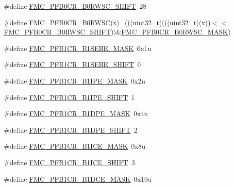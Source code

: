 \begin{DoxyCompactItemize}
\#define \hyperlink{group___f_m_c___register___masks_gafc34ff86025a1657d05d3f6a2de1ec7f}{F\+M\+C\+\_\+\+P\+F\+B0\+C\+R\+\_\+\+B0\+R\+W\+S\+C\+\_\+\+S\+H\+I\+FT}~28
\item 
\#define \hyperlink{group___f_m_c___register___masks_ga4ddd6d13f0feab2f52a6ab8e3417d738}{F\+M\+C\+\_\+\+P\+F\+B0\+C\+R\+\_\+\+B0\+R\+W\+SC}(x)                                      ~(((\hyperlink{_p_e___types_8h_a33594304e786b158f3fb30289278f5af}{uint32\+\_\+t})(((\hyperlink{_p_e___types_8h_a33594304e786b158f3fb30289278f5af}{uint32\+\_\+t})(x))$<$$<$\hyperlink{group___f_m_c___register___masks_gafc34ff86025a1657d05d3f6a2de1ec7f}{F\+M\+C\+\_\+\+P\+F\+B0\+C\+R\+\_\+\+B0\+R\+W\+S\+C\+\_\+\+S\+H\+I\+FT}))\&\hyperlink{group___f_m_c___register___masks_ga6231856131c9747d8bf0b2bebcf4f172}{F\+M\+C\+\_\+\+P\+F\+B0\+C\+R\+\_\+\+B0\+R\+W\+S\+C\+\_\+\+M\+A\+SK})
\item 
\#define \hyperlink{group___f_m_c___register___masks_ga420c5676807fc85197707ac092c58221}{F\+M\+C\+\_\+\+P\+F\+B1\+C\+R\+\_\+\+B1\+S\+E\+B\+E\+\_\+\+M\+A\+SK}~0x1u
\item 
\#define \hyperlink{group___f_m_c___register___masks_ga8666915cae16d07904756da796935f3c}{F\+M\+C\+\_\+\+P\+F\+B1\+C\+R\+\_\+\+B1\+S\+E\+B\+E\+\_\+\+S\+H\+I\+FT}~0
\item 
\#define \hyperlink{group___f_m_c___register___masks_ga282ed00b64bb32336610c04d1404e86d}{F\+M\+C\+\_\+\+P\+F\+B1\+C\+R\+\_\+\+B1\+I\+P\+E\+\_\+\+M\+A\+SK}~0x2u
\item 
\#define \hyperlink{group___f_m_c___register___masks_ga6685876e76f4ea584622a68f6bea6b56}{F\+M\+C\+\_\+\+P\+F\+B1\+C\+R\+\_\+\+B1\+I\+P\+E\+\_\+\+S\+H\+I\+FT}~1
\item 
\#define \hyperlink{group___f_m_c___register___masks_gad8ceabcc8b8c9f94ac2216c3bf87f3af}{F\+M\+C\+\_\+\+P\+F\+B1\+C\+R\+\_\+\+B1\+D\+P\+E\+\_\+\+M\+A\+SK}~0x4u
\item 
\#define \hyperlink{group___f_m_c___register___masks_ga9a6d2f7bfce24b100a34731744602db7}{F\+M\+C\+\_\+\+P\+F\+B1\+C\+R\+\_\+\+B1\+D\+P\+E\+\_\+\+S\+H\+I\+FT}~2
\item 
\#define \hyperlink{group___f_m_c___register___masks_ga54e7a000de93d88f2b6287e197890347}{F\+M\+C\+\_\+\+P\+F\+B1\+C\+R\+\_\+\+B1\+I\+C\+E\+\_\+\+M\+A\+SK}~0x8u
\item 
\#define \hyperlink{group___f_m_c___register___masks_gab0d831cd340d45b11c048d8a51bb9e15}{F\+M\+C\+\_\+\+P\+F\+B1\+C\+R\+\_\+\+B1\+I\+C\+E\+\_\+\+S\+H\+I\+FT}~3
\item 
\#define \hyperlink{group___f_m_c___register___masks_gaa101cb7bed362dfe0e710d0215b4b150}{F\+M\+C\+\_\+\+P\+F\+B1\+C\+R\+\_\+\+B1\+D\+C\+E\+\_\+\+M\+A\+SK}~0x10u
$$
\end{DoxyCompactItemize}
